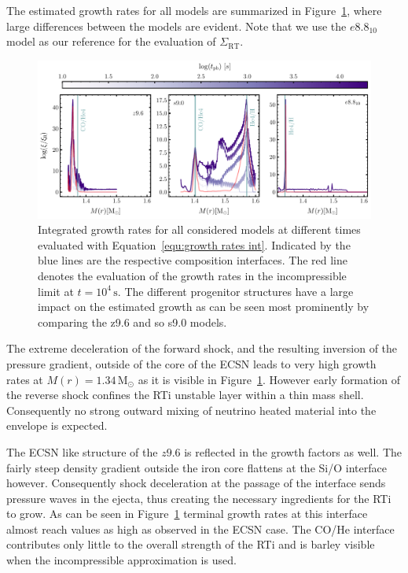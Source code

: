 \documentclass[fleqn,usenatbib]{mnras}
\begin{document}
The estimated growth rates for all models are summarized in Figure~\ref{fig:growth rates}, where large differences between the models are evident. Note that we use the $e8.8_{10}$ model as our reference for the evaluation of $\Sigma_{\mathrm{RT}}$.

\begin{figure}
 \centering
 \includegraphics[width=\textwidth]{pic/growth_rates_1d.pdf}
 \caption{Integrated growth rates for all considered models at different times evaluated with Equation~\ref{equ:growth rates int}. Indicated by the blue lines are the respective composition interfaces. The red line denotes the evaluation of the growth rates in the incompressible limit at $t=10^{4}\,\text{s}$. The different progenitor structures have a large impact on the estimated growth as can be seen most prominently by comparing the z9.6 and so s9.0 models. }
 \label{fig:growth rates}
\end{figure}

The extreme deceleration of the forward shock, and the resulting inversion of the pressure gradient, outside of the core of the ECSN leads to very high growth rates at $M(r)=1.34\,\mathrm{M_{\odot}}$ as it is visible in Figure~\ref{fig:growth rates}. However early formation of the reverse shock confines the RTi unstable layer within a thin mass shell. Consequently no strong outward mixing of neutrino heated material into the envelope is expected.

The ECSN like structure of the $z9.6$ is reflected in the growth factors as well.
The fairly steep density gradient outside the iron core flattens at the Si/O interface however. Consequently shock deceleration at the passage of the interface sends pressure waves in the ejecta, thus creating the necessary ingredients for the RTi to grow. As can be seen in Figure~\ref{fig:growth rates} terminal growth rates at this interface almost reach values as high as observed in the ECSN case. The CO/He interface contributes only little to the overall strength of the RTi and is barley visible when the incompressible approximation is used.
\end{document}

